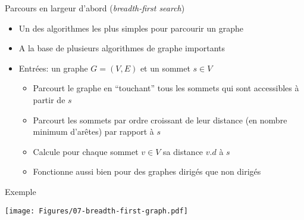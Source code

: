 \begin{frame}{Parcours en largeur d'abord ({\it breadth-first search})}
\begin{itemize}
\item Un des algorithmes les plus simples pour parcourir un graphe
\item A la base de plusieurs algorithmes de graphe importants%

\bigskip

\item Entrées: un graphe $G=(V,E)$ et un sommet $s\in V$
\begin{itemize}
\item Parcourt le graphe en ``touchant'' tous les sommets qui sont accessibles à partir de $s$
\item Parcourt les sommets par ordre croissant de leur distance (en
  nombre minimum d'arêtes) par rapport à $s$
\item Calcule pour chaque sommet $v\in V$ sa distance $v.d$ à $s$
\item Fonctionne aussi bien pour des graphes dirigés que non dirigés
\end{itemize}
\end{itemize}

\end{frame}

\begin{frame}{Exemple}

\centerline{\texttt{[image: Figures/07-breadth-first-graph.pdf]}}

\end{frame}

